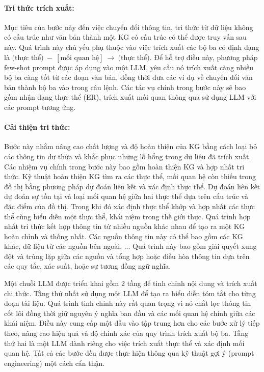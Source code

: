 \paragraph{Tri thức trích xuất:}
Mục tiêu của bước này đến việc chuyển đổi thông tin, tri thức từ dữ liệu không có cấu trúc như văn bản thành một KG có cấu trúc có thể được truy vấn sau này. Quá trình này chủ yếu phụ thuộc vào việc trích xuất các bộ ba có định dạng là \(
\text{(thực thể)} \ - \ \left[\text{mối quan hệ}\right] \ \rightarrow \ \text{(thực thể)}
\).
Để hỗ trợ điều này, phương pháp few-shot prompt được áp dụng vào một LLM, yêu cầu nó trích xuất càng nhiều bộ ba càng tốt từ các đoạn văn bản, đồng thời đưa các ví dụ về chuyển đổi văn bản thành bộ ba vào trong câu lệnh. Các tác vụ chính trong bước này sẽ bao gồm nhận dạng thực thể (ER), trích xuất mối quan thông qua sử dụng LLM với các prompt tương ứng.

\paragraph{Cải thiện tri thức:}
Bước này nhằm nâng cao chất lượng và độ hoàn thiện của KG bằng cách loại bỏ các thông tin dư thừa và khắc phục những lỗ hổng trong dữ liệu đã trích xuất. Các nhiệm vụ chính trong bước này bao gồm hoàn thiện KG và hợp nhất tri thức.
Kỹ thuật hoàn thiện KG tìm ra các thực thể, mối quan hệ còn thiếu trong đồ thị bằng phương pháp dự đoán liên kết và xác định thực thể. Dự đoán liên kết dự đoán sự tồn tại và loại mối quan hệ giữa hai thực thể dựa trên cấu trúc và đặc điểm của đồ thị. Trong khi đó xác định thực thể khớp và hợp nhất các thực thể cùng biểu diễn một thực thể, khái niệm trong thế giới thực.
Quá trình hợp nhất tri thức kết hợp thông tin từ nhiều nguồn khác nhau để tạo ra một KG hoàn chỉnh và thống nhất. Các nguồn thông tin này có thể bao gồm các KG khác, dữ liệu từ các nguồn bên ngoài, ... Quá trình này bao gồm giải quyết xung đột và trùng lặp giữa các nguồn và tổng hợp hoặc điều hòa thông tin dựa trên các quy tắc, xác suất, hoặc sự tương đồng ngữ nghĩa.

Một chuỗi LLM được triển khai gồm 2 tầng để tinh chỉnh nội dung và trích xuất chi thức. Tầng thứ nhất sử dụng một LLM để tạo ra biểu diễn tóm tắt cho từng đoạn tài liệu. Quá trình tinh chỉnh này rất quan trọng vì nó chắt lọc thông tin cốt lõi đồng thời giữ nguyên ý nghĩa ban đầu và các mối quan hệ chính giữa các khái niệm. Điều này cung cấp một đầu vào tập trung hơn cho các bước xử lý tiếp theo, nâng cao hiệu quả và độ chính xác của quy trình trích xuất bộ ba. Tầng thứ hai là một LLM dành riêng cho việc trích xuất thực thể và xác định mối quan hệ. Tất cả các bước đều được thực hiện thông qua kỹ thuật gợi ý (prompt engineering) một cách cẩn thận.

